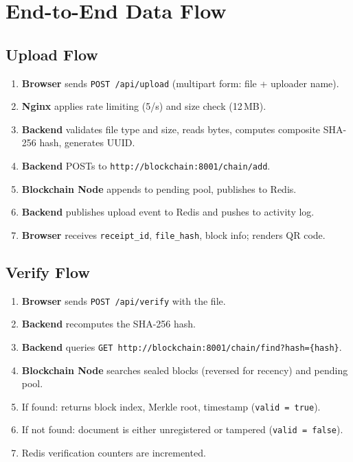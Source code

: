 \documentclass[12pt, a4paper]{report}
\begin{document}
\chapter{End-to-End Data Flow}

\section{Upload Flow}

\begin{enumerate}
    \item \textbf{Browser} sends \texttt{POST /api/upload} (multipart form:
          file + uploader name).
    \item \textbf{Nginx} applies rate limiting (5/s) and size check (12\,MB).
    \item \textbf{Backend} validates file type and size, reads bytes, computes
          composite SHA-256 hash, generates UUID.
    \item \textbf{Backend} POSTs to \texttt{http://blockchain:8001/chain/add}.
    \item \textbf{Blockchain Node} appends to pending pool, publishes to Redis.
    \item \textbf{Backend} publishes upload event to Redis and pushes to
          activity log.
    \item \textbf{Browser} receives \texttt{receipt\_id}, \texttt{file\_hash},
          block info; renders QR code.
\end{enumerate}

\section{Verify Flow}

\begin{enumerate}
    \item \textbf{Browser} sends \texttt{POST /api/verify} with the file.
    \item \textbf{Backend} recomputes the SHA-256 hash.
    \item \textbf{Backend} queries
          \texttt{GET http://blockchain:8001/chain/find?hash=\{hash\}}.
    \item \textbf{Blockchain Node} searches sealed blocks (reversed for recency)
          and pending pool.
    \item If found: returns block index, Merkle root, timestamp
          (\texttt{valid = true}).
    \item If not found: document is either unregistered or tampered
          (\texttt{valid = false}).
    \item Redis verification counters are incremented.
\end{enumerate}
\end{document}
